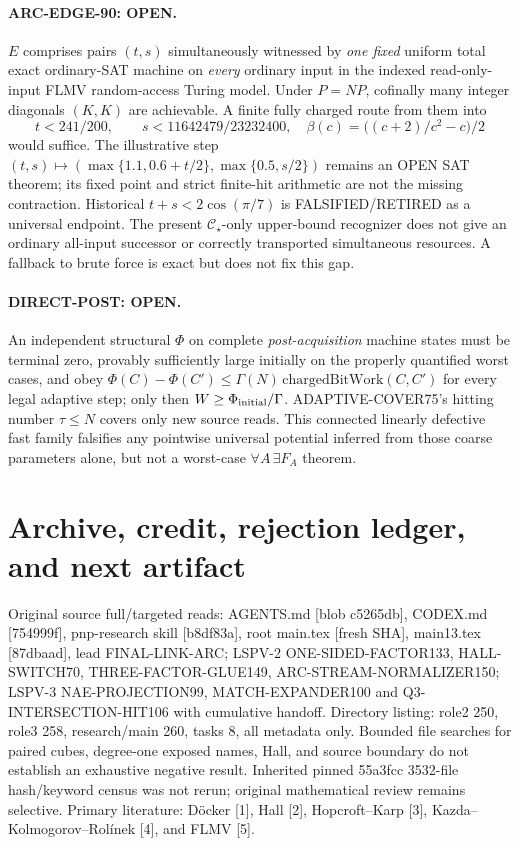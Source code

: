 \documentclass[11pt]{article}
\newcommand{\CS}{\mathcal C_\star}
\begin{document}
\paragraph{ARC-EDGE-90: OPEN.}
$E$ comprises pairs $(t,s)$ simultaneously witnessed by \emph{one fixed} uniform total exact ordinary-SAT machine on \emph{every} ordinary input in the indexed read-only-input FLMV random-access Turing model. Under $P=NP$, cofinally many integer diagonals $(K,K)$ are achievable. A finite fully charged route from them into
\[
t<241/200,\qquad s<11642479/23232400,\quad
\beta(c)=\bigl((c+2)/c^2-c\bigr)/2
\]
would suffice. The illustrative step $(t,s)\mapsto(\max\{1.1,0.6+t/2\},\max\{0.5,s/2\})$ remains an OPEN SAT theorem; its fixed point and strict finite-hit arithmetic are not the missing contraction. Historical $t+s<2\cos(\pi/7)$ is FALSIFIED/RETIRED as a universal endpoint. The present $\CS$-only upper-bound recognizer does not give an ordinary all-input successor or correctly transported simultaneous resources. A fallback to brute force is exact but does not fix this gap.

\paragraph{DIRECT-POST: OPEN.}
An independent structural $\Phi$ on complete \emph{post-acquisition} machine states must be terminal zero, provably sufficiently large initially on the properly quantified worst cases, and obey $\Phi(C)-\Phi(C')\le\Gamma(N)\,\mathrm{chargedBitWork}(C,C')$ for every legal adaptive step; only then $W\ge\Phi_{\rm initial}/\Gamma$. ADAPTIVE-COVER75's hitting number $\tau\le N$ covers only new source reads. This connected linearly defective fast family falsifies any pointwise universal potential inferred from those coarse parameters alone, but not a worst-case $\forall A\,\exists F_A$ theorem.

\section{Archive, credit, rejection ledger, and next artifact}
Original source full/targeted reads: AGENTS.md [blob c5265db], CODEX.md [754999f], pnp-research skill [b8df83a], root main.tex [fresh SHA], main13.tex [87dbaad], lead FINAL-LINK-ARC; LSPV-2 ONE-SIDED-FACTOR133, HALL-SWITCH70, THREE-FACTOR-GLUE149, ARC-STREAM-NORMALIZER150; LSPV-3 NAE-PROJECTION99, MATCH-EXPANDER100 and Q3-INTERSECTION-HIT106 with cumulative handoff. Directory listing: role2 250, role3 258, research/main 260, tasks 8, all metadata only. Bounded file searches for paired cubes, degree-one exposed names, Hall, and source boundary do not establish an exhaustive negative result. Inherited pinned 55a3fcc 3532-file hash/keyword census was not rerun; original mathematical review remains selective. Primary literature: D\"ocker [1], Hall [2], Hopcroft--Karp [3], Kazda--Kolmogorov--Rol\'inek [4], and FLMV [5].
\end{document}

